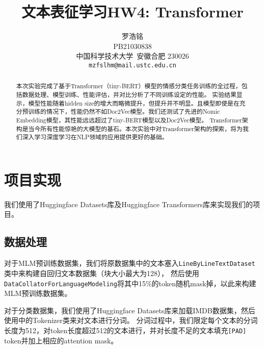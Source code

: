 \documentclass{article}
\title{文本表征学习HW4: Transformer}
\author{
  罗浩铭 \\
  PB21030838\\
  中国科学技术大学\ 安徽合肥 230026 \\
  \texttt{mzfslhm@mail.ustc.edu.cn} \\
}
\begin{document}
\maketitle


\begin{abstract}
  本次实验完成了基于Transformer（tiny-BERT）模型的情感分类任务训练的全过程，包括数据处理、模型训练、性能评估，并对比分析了不同训练设定的性能。
  实验结果显示，模型性能随着hidden size的增大而略微提升，但提升并不明显。且模型即使是在充分预训练的情况下，性能仍然不如Doc2Vec模型。我们还测试了先进的Nomic Embedding模型，其性能远远超过了tiny-BERT模型以及Doc2Vec模型。
  Transformer架构是当今所有性能惊艳的大模型的基石。本次实验中对Transformer架构的探索，将为我们深入学习深度学习在NLP领域的应用提供更好的基础。
\end{abstract}





\section{项目实现}
我们使用了Huggingface Datasets库及Huggingface Transformers库来实现我们的项目。
\subsection{数据处理}
对于MLM预训练数据集，我们将原数据集中的文本塞入\verb|LineByLineTextDataset|类中来构建自回归文本数据集（块大小最大为128），
然后使用\verb|DataCollatorForLanguageModeling|将其中15\%的token随机mask掉，以此来构建MLM预训练数据集。

对于分类数据集，我们使用了Huggingface Datasets库来加载IMDB数据集，然后使用中的Tokenizer类来对文本进行分词。
分词过程中，我们限定每个文本的分词长度为512，对token长度超过512的文本进行，并对长度不足的文本填充\verb|[PAD]| token并加上相应的attention mask。
\end{document}
